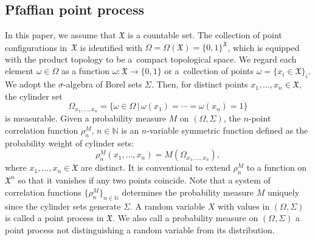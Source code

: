 \documentclass[11pt]{article}
\numberwithin{equation}{section}
\numberwithin{equation}{section}
\newcommand{\mfrak}[1]{\mathfrak{#1}}
\newcommand{\mbb}[1]{\mathbb{#1}}
\begin{document}
\subsection{Pfaffian point process}
In this paper, we assume that $\mfrak{X}$ is a countable set. The collection of point configurations in~$\mfrak{X}$ is identified with $\Omega=\Omega (\mfrak{X})=\{0,1\}^{\mfrak{X}}$, which is equipped with the product topology to be a~compact topological space. We regard each element $\omega\in \Omega$ as a function $\omega\colon \mfrak{X}\to\{0,1\}$ or a~collection of points $\omega=\{x_{i}\in\mfrak{X}\}_{i}$. We adopt the $\sigma$-algebra of Borel sets $\Sigma$. Then, for distinct points $x_{1},\dots, x_{n}\in \mfrak{X}$, the cylinder set
\begin{equation*}
	\Omega_{x_{1},\dots, x_{n}}=\{\omega\in\Omega\,|\,\omega (x_{1})=\cdots =\omega (x_{n})=1\}
\end{equation*}
is measurable.
Given a probability measure $M$ on $(\Omega,\Sigma)$, the $n$-point correlation function $\rho^{M}_{n}$, $n\in\mbb{N}$ is an $n$-variable symmetric function defined as the probability weight of cylinder sets:
\begin{equation*}
	\rho^{M}_{n}(x_{1},\dots, x_{n})=M(\Omega_{x_{1},\dots, x_{n}}),
\end{equation*}
where $x_{1},\dots, x_{n}\in \mfrak{X}$ are distinct. It is conventional to extend $\rho^{M}_{n}$ to a function on $\mfrak{X}^{n}$ so that it vanishes if any two points coincide.
Note that a system of correlation functions $\big\{\rho^{M}_{n}\big\}_{n\in\mbb{N}}$ determines the probability measure $M$ uniquely since the cylinder sets generate $\Sigma$.
A random variable $X$ with values in $(\Omega,\Sigma)$ is called a point process in $\mfrak{X}$. We also call a probability measure on $(\Omega,\Sigma)$ a point process not distinguishing a random variable from its distribution.
\end{document}
